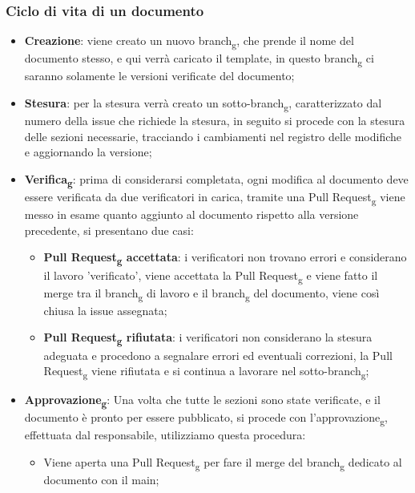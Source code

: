         \subsubsection{Ciclo di vita di un documento}
        \begin{itemize}
            \item \textbf{Creazione}: viene creato un nuovo branch\textsubscript{g}, che prende il nome del documento stesso, e qui verrà caricato il template, in questo branch\textsubscript{g} ci saranno solamente le versioni verificate del documento;
            \item \textbf{Stesura}: per la stesura verrà creato un sotto-branch\textsubscript{g}, caratterizzato dal numero della issue che richiede la stesura, in seguito si procede con la stesura delle sezioni necessarie, tracciando i cambiamenti nel registro delle modifiche e aggiornando la versione;
            \item \textbf{Verifica\textsubscript{g}}: prima di considerarsi completata, ogni modifica al documento deve essere verificata da due verificatori in carica, tramite una Pull Request\textsubscript{g} viene messo in esame quanto aggiunto al documento rispetto alla versione precedente, si presentano due casi:
            \begin{itemize}
                \item \textbf{Pull Request\textsubscript{g} accettata}: i verificatori non trovano errori e considerano il lavoro 'verificato', viene accettata la Pull Request\textsubscript{g} e viene fatto il merge tra il branch\textsubscript{g} di lavoro e il branch\textsubscript{g} del documento, viene così chiusa la issue assegnata;
                \item \textbf{Pull Request\textsubscript{g} rifiutata}: i verificatori non considerano la stesura adeguata e procedono a segnalare errori ed eventuali correzioni, la Pull Request\textsubscript{g} viene rifiutata e si continua a lavorare nel sotto-branch\textsubscript{g};
            \end{itemize}
            \item \textbf{Approvazione\textsubscript{g}}: Una volta che tutte le sezioni sono state verificate, e il documento è pronto per essere pubblicato, si procede con l'approvazione\textsubscript{g}, effettuata dal responsabile, utilizziamo questa procedura:
            \begin{itemize}
                \item Viene aperta una Pull Request\textsubscript{g} per fare il merge del branch\textsubscript{g} dedicato al documento con il main;

\end{itemize}
\end{itemize}
